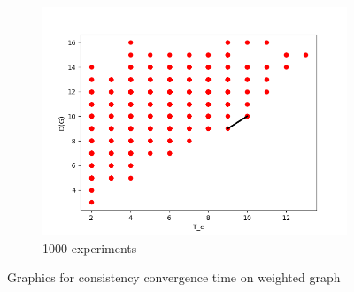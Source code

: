 \documentclass[a4paper,14pt]{llncs}
\begin{document}
\begin{figure}[p]
\begin{subfigure}{0.3\linewidth}
\centering\includegraphics[width=\linewidth]{images/1000-consistency-convergence-weighted.png}
\caption{1000 experiments}\label{pic:1000-w}
\end{subfigure}
\caption{Graphics for consistency convergence time on weighted graph}
\end{figure}
%
\end{document}

